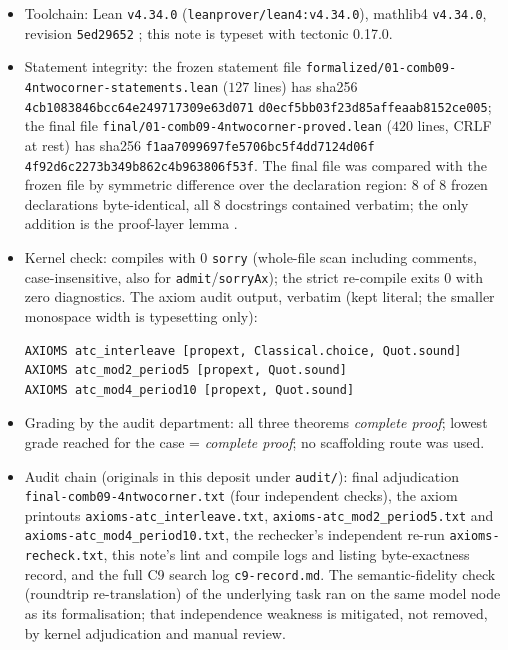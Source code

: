 \documentclass[11pt]{article}
\theoremstyle{definition}
\begin{document}
\begin{itemize}
\item Toolchain: Lean \texttt{v4.34.0} (\texttt{leanprover/lean4:v4.34.0}),
mathlib4 \texttt{v4.34.0}, revision \texttt{5ed29652}
\cite{lean4,mathlib,mathlib4-tag}; this note is typeset with tectonic 0.17.0.
\item Statement integrity: the frozen statement file
\texttt{formalized/}\allowbreak\texttt{01-comb09-4ntwocorner-statements.lean}
($127$ lines) has
sha256 \texttt{4cb1083846bcc64e249717309e63d071}\allowbreak
\texttt{d0ecf5bb03f23d85affeaab8152ce005};
the final file \texttt{final/}\allowbreak\texttt{01-comb09-4ntwocorner-proved.lean}
($420$ lines,
CRLF at rest) has sha256
\texttt{f1aa7099697fe5706bc5f4dd7124d06f}\allowbreak
\texttt{4f92d6c2273b349b862c4b963806f53f}. The
final file was compared with the frozen file by symmetric difference over the
declaration region: $8$ of $8$ frozen declarations byte-identical, all $8$
docstrings contained verbatim; the only addition is the proof-layer lemma
.
\item Kernel check: compiles with $0$ \texttt{sorry} (whole-file scan including
comments, case-insensitive, also for \texttt{admit}/\texttt{sorryAx}); the
strict re-compile exits $0$ with zero diagnostics. The axiom audit output,
verbatim (kept literal; the smaller monospace width is typesetting only):
\begin{lstlisting}[basicstyle=\ttfamily\footnotesize,frame=none]
AXIOMS atc_interleave [propext, Classical.choice, Quot.sound]
AXIOMS atc_mod2_period5 [propext, Quot.sound]
AXIOMS atc_mod4_period10 [propext, Quot.sound]
\end{lstlisting}
\item Grading by the audit department: all three theorems \emph{complete
proof}; lowest grade reached for the case = \emph{complete proof}; no
scaffolding route was used.
\item Audit chain (originals in this deposit under \texttt{audit/}): final
adjudication \texttt{final-comb09-4ntwocorner.txt} (four independent checks),
the axiom printouts \texttt{axioms-atc\_interleave.txt},
\texttt{axioms-atc\_mod2\_period5.txt} and
\texttt{axioms-atc\_mod4\_period10.txt}, the rechecker's independent re-run
\texttt{axioms-recheck.txt}, this note's lint and compile logs and listing
byte-exactness record, and the full C9 search log \texttt{c9-record.md}. The
semantic-fidelity check (roundtrip re-translation) of the underlying task ran on
the same model node as its formalisation; that independence weakness is
mitigated, not removed, by kernel adjudication and manual review.
\end{itemize}
\end{document}
